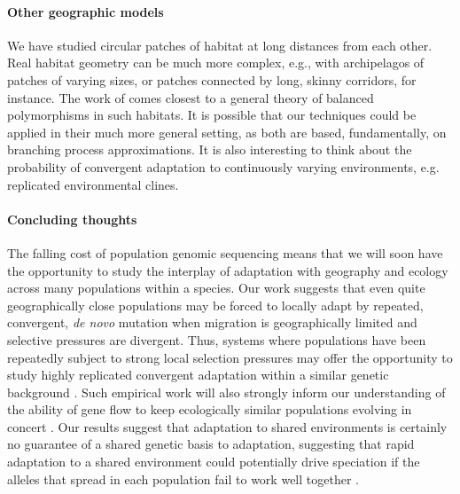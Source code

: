 \documentclass{article}
\newcommand{\citep}[1]{\cite{#1}}
\newcommand{\citet}[1]{\cite{#1}}
\begin{document}
\paragraph{Other geographic models}
We have studied circular patches of habitat at long distances from each other.
Real habitat geometry can be much more complex,
e.g., with archipelagos of patches of varying sizes, 
or patches connected by long, skinny corridors, for instance.
The work of \citet{cantrell1991diffusive} comes closest to a general theory of balanced polymorphisms in such habitats.
It is possible that our techniques could be applied in their much more general setting,
as both are based, fundamentally, on branching process approximations.
It is also interesting to think about the probability of convergent
adaptation to continuously varying environments, e.g. replicated
environmental clines.

\paragraph{Concluding thoughts}
The falling cost of population genomic sequencing means that we will soon have the
opportunity to study the interplay of adaptation with geography and ecology 
across many populations within a species. 
Our work suggests that even quite geographically close populations 
may be forced to locally adapt by repeated, convergent, \textit{de novo} mutation 
when migration is geographically limited
and selective pressures are divergent.
Thus, systems where populations have been repeatedly subject to 
strong local selection pressures may offer the opportunity 
to study highly replicated convergent adaptation within a similar
genetic background \citep{stern2013genetic}.  
Such empirical work will also strongly inform our understanding of the
ability of gene flow to keep ecologically similar populations evolving
in concert \citep{sexton2013genetic}.
Our results suggest that adaptation to shared environments is
certainly no guarantee of a shared genetic basis to adaptation, 
suggesting that rapid adaptation to a shared environment could potentially drive
speciation if the alleles that spread in each population fail to work
well together \citep{Kondrashov:03}. 


\end{document}
